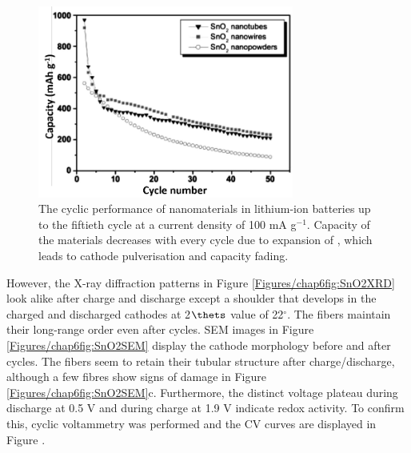 \begin{figure}[th!]
\centering
\includegraphics[width=0.75\textwidth]{Figures/chap6fig/sno2pap.pdf}
\caption{The cyclic performance of  nanomaterials in lithium-ion batteries up to the fiftieth cycle at a current density of 100 mA g$^{-1}$. Capacity of the materials decreases with every cycle due to expansion of , which leads to cathode pulverisation and capacity fading.}
\label{Figures/chap6fig:sno2pap}
\end{figure}
However, the X-ray diffraction patterns in Figure \ref{Figures/chap6fig:SnO2XRD} look alike after charge and discharge except a shoulder that develops in the charged and discharged cathodes at 2$\thets$ value of 22$^{\circ}$. The fibers maintain their long-range order even after cycles. SEM images in Figure \ref{Figures/chap6fig:SnO2SEM} display the cathode morphology before and after cycles. The fibers seem to retain their tubular structure after charge/discharge, although a few fibres show signs of damage in Figure \ref{Figures/chap6fig:SnO2SEM}c. Furthermore, the distinct voltage plateau during discharge at 0.5 V and during charge at 1.9 V indicate redox activity. To confirm this, cyclic voltammetry was performed and the CV curves are displayed in Figure . 

